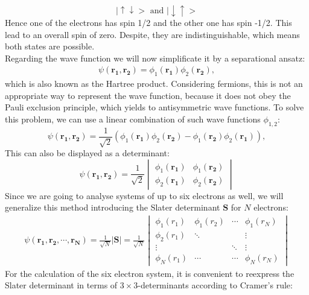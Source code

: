 \begin{equation}
|\uparrow \downarrow > \text{~and~} |\downarrow \uparrow >
\end{equation}
Hence one of the electrons has spin 1/2 and the other one has spin -1/2. This lead to an overall spin of zero. Despite, they are indistinguishable, which means both states are possible.\\
Regarding the wave function we will now simplificate it by a separational ansatz:
\begin{align}
\psi (\mathbf{r_1,r_2}) = \phi_1(\mathbf{r_1}) \phi_2(\mathbf{r_2}), 
\end{align}
which is also known as the Hartree product. Considering fermions, this is not an appropriate way to represent the wave function, because it does not obey the Pauli exclusion principle, which yields to antisymmetric wave functions. To solve this problem, we can use a linear combination of such wave functions $\phi_{1,2}$:
\begin{equation}
\psi (\mathbf{r_1,r_2}) = \frac{1}{\sqrt{2}}\left(\phi_1(\mathbf{r_1}) \phi_2(\mathbf{r_2})-\phi_1(\mathbf{r_2}) \phi_2(\mathbf{r_1})\right), 
\end{equation}
This can also be displayed as a determinant:
\begin{equation}
\psi (\mathbf{r_1,r_2}) = \frac{1}{\sqrt{2}} 
\begin{vmatrix}
\phi_1(\mathbf{r_1}) &\phi_1(\mathbf{r_2})\\
\phi_2(\mathbf{r_1}) & \phi_2(\mathbf{r_2})
\end{vmatrix}
\end{equation}
Since we are going to analyse systems of up to six electrons as well, we will generalize this method introducing the Slater determinant $\mathbf{S}$ for $N$ electrons:
\begin{align}
\psi (\mathbf{r_1,r_2,\cdots,r_N}) = \frac{1}{\sqrt{N}} |\mathbf{S}| = \frac{1}{\sqrt{N}}
\begin{vmatrix}
\phi_1(r_1) & \phi_1(r_2) & \cdots & \phi_1(r_N)\\
\phi_2(r_1) & \ddots & &\vdots \\
\vdots & & \ddots& \vdots\\
\phi_N(r_1) & \cdots & \cdots & \phi_N(r_N)
\end{vmatrix}
\end{align}
For the calculation of the six electron system, it is convenient to reexpress the Slater determinant in terms of $3\times 3$-determinants according to Cramer's rule:
